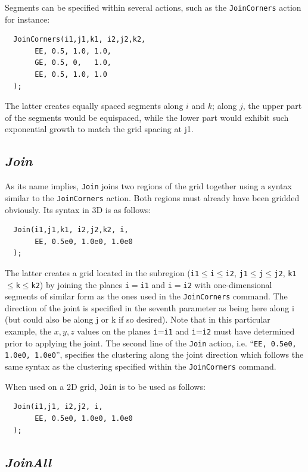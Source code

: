 \documentclass{warpdoc}
\begin{document}
Segments can be specified within several actions, such as the  \verb|JoinCorners| action for instance:
%
\begin{verbatim}
  JoinCorners(i1,j1,k1, i2,j2,k2,
       EE, 0.5, 1.0, 1.0,
       GE, 0.5, 0,   1.0,
       EE, 0.5, 1.0, 1.0
  );
\end{verbatim}
%
The latter creates equally spaced segments along $i$ and $k$;
along $j$, the upper part of the segments would be equispaced,
while the lower part would exhibit such exponential growth to
match the grid spacing at j1.


\subsection{\emph{Join}}

As its name implies, \verb|Join| joins two regions
of the grid together using a syntax similar to the
\verb|JoinCorners| action. Both regions must already
have been gridded obviously. Its syntax in 3D is as follows:
%
\begin{verbatim}
  Join(i1,j1,k1, i2,j2,k2, i,
       EE, 0.5e0, 1.0e0, 1.0e0
  );
\end{verbatim}
%
The latter creates a grid located in the subregion
(\verb|i1|$\leq$\verb|i|$\leq$\verb|i2|,
  \verb|j1|$\leq$\verb|j|$\leq$\verb|j2|,
  \verb|k1|$\leq$\verb|k|$\leq$\verb|k2|)
by joining the planes \verb|i|$=$\verb|i1| and \verb|i|$=$\verb|i2| with
one-dimensional segments of similar form as the ones used in the
\verb|JoinCorners| command. The direction of the joint is
specified in the seventh parameter as being here along i
(but could also be along j or k if so desired). Note that
in this particular example, the $x,y,z$ values on the planes
\verb|i|=\verb|i1| and \verb|i|=\verb|i2| must have determined prior
to applying the joint.  The second line of the \verb|Join|
action, i.e. ``\verb|EE, 0.5e0, 1.0e0, 1.0e0|'', specifies the clustering
along the joint direction which follows the same syntax as
the clustering specified within the \verb|JoinCorners| command.

When used on a 2D grid, \verb|Join| is to be used as follows:
%
\begin{verbatim}
  Join(i1,j1, i2,j2, i,
       EE, 0.5e0, 1.0e0, 1.0e0
  );
\end{verbatim}



\subsection{\emph{JoinAll}}
\end{document}
